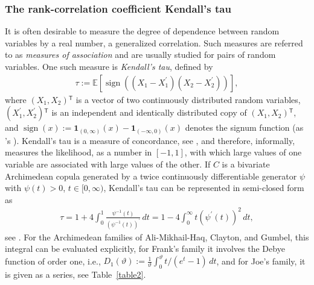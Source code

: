 \documentclass[nojss,article]{jss}
\theoremstyle{mythmstyle}
\newcommand*{\R}{\proglang{R}}%
\newcommand*{\I}{\mathbf{1}}
\newcommand*{\IE}{\mathbb{E}}
\newcommand*{\sign}{\operatorname*{sign}}
\newcommand*{\vt}{\vartheta}
\newcommand*{\psiD}{\psi^\prime}
\newcommand*{\psii}{{\psi^{-1}}}
\newcommand{\tr}{\ensuremath{^\mathsf{T}}}%
\begin{document}
\subsubsection{The rank-correlation coefficient Kendall's tau}
It is often desirable to measure the degree of dependence between random
variables by a real number, a generalized correlation. Such measures are
referred to as \textit{measures of association} and are usually studied for
pairs of random variables. One such measure is \textit{Kendall's tau}, defined by
\begin{align*}
  \tau:=\IE[\sign((X_1-X_1^\prime)(X_2-X_2^\prime))],
\end{align*}
where $(X_1,X_2)\tr$ is a vector of two continuously distributed random
variables, $(X_1^\prime,X_2^\prime)\tr$ is an independent and identically
distributed copy of $(X_1,X_2)\tr$, and
$\sign(x):=\I_{(0,\infty)}(x)-\I_{(-\infty,0)}(x)$ denotes the signum function
(as \R's ). Kendall's tau is a measure of concordance, see
\citet{scarsini1984}, and therefore,
informally, measures the likelihood, as a number in $[-1,1]$, with which
large values of one variable are associated with large values of the other.
If $C$ is a bivariate Archimedean copula generated by a twice continuously
differentiable generator $\psi$ with $\psi(t)>0$, $t\in[0,\infty)$,
Kendall's tau can be represented in semi-closed form as
\begin{align*}
  \tau= 1 + 4\int_0^1\frac{\psii(t)}{(\psii(t))^\prime}\,dt =
        1 - 4\int_0^\infty t(\psiD(t))^2\,dt,
\end{align*}
see \citet[p.\ 91]{joe1997}. For the Archimedean families of
Ali-Mikhail-Haq, Clayton, and Gumbel, this integral can be evaluated
explicitly, for Frank's family it involves the Debye function of order one,
i.e., $D_1(\vt):=\frac 1 \vt \int_0^\vt t/(e^t-1)\,dt$, and for Joe's family, it
is given as a series, see Table~\ref{table2}.
\end{document}

